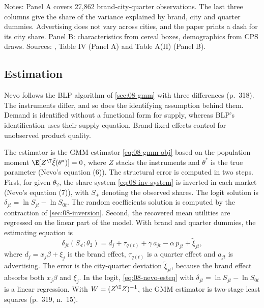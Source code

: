 \begin{table}[htbp]
\smallskip
\begin{minipage}{0.97\linewidth}
\footnotesize Notes: Panel A covers 27,862 brand-city-quarter observations. The last three columns give the
share of the variance explained by brand, city and quarter dummies. Advertising does not vary across cities,
and the paper prints a dash for its city share. Panel B: characteristics from cereal boxes, demographics from
CPS draws. Sources: \citet{Nevo2001}, Table IV (Panel A) and Table A(II) (Panel B).
\end{minipage}
\end{table}

\subsection{Estimation}\label{sec:08-nevo01-estimation}

Nevo follows the BLP algorithm of \cref{sec:08-gmm} with three differences (p.~318). The instruments differ,
and so does the identifying assumption behind them. Demand is identified without a functional form for supply,
whereas BLP's identification uses their supply equation. Brand fixed effects control for unobserved product
quality.

The estimator is the GMM estimator \eqref{eq:08-gmm-obj} based on the population moment
$\E[Z^{\T}\tilde\xi(\theta^*)] = 0$, where $Z$ stacks the instruments and $\theta^*$ is the true parameter (Nevo's
equation (6)). The structural error is computed in two steps. First, for given $\theta_2$, the share system
\eqref{eq:08-inv-system} is inverted in each market (Nevo's equation (7)), with $S_{\cdot t}$ denoting the observed
shares. The logit solution is $\delta_{jt} = \ln S_{jt} - \ln S_{0t}$. The random coefficients solution is computed by
the contraction of \cref{sec:08-inversion}. Second, the recovered mean utilities are regressed on the linear part of
the model. With brand and quarter dummies, the estimating equation is
\begin{equation}\label{eq:08-nevo-esteq}
\delta_{jt}(S_{\cdot t}; \theta_2) = d_j + \tau_{q(t)} + \gamma\, a_{jt} - \alpha\, p_{jt} + \tilde\xi_{jt},
\end{equation}
where $d_j = x_j\beta + \xi_j$ is the brand effect, $\tau_{q(t)}$ is a quarter effect and $a_{jt}$ is
advertising. The error is the city-quarter deviation $\tilde\xi_{jt}$, because the brand effect absorbs both
$x_j\beta$ and $\xi_j$. In the logit, \cref{eq:08-nevo-esteq} with $\delta_{jt} = \ln S_{jt}-\ln S_{0t}$ is a
linear regression. With $W = (Z^{\T}Z)^{-1}$, the GMM estimator is two-stage least squares (p.~319, n.~15).

